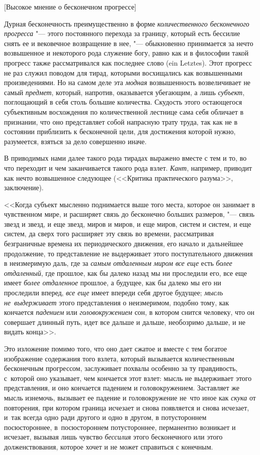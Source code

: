 %
{[Высокое мнение о бесконечном прогрессе]}

Дурная бесконечность преимущественно в форме
{\em количественного бесконечного прогресса} "--- этого постоянного перехода за
границу, который есть бессилие снять ее и вековечное возвращение в нее,
"--- обыкновенно принимается за нечто возвышенное и некоторого рода служение
богу, равно как и в философии такой прогресс также рассматривался как последнее
слово (ein Letztes). Этот прогресс не раз служил поводом для тирад, которыми
восхищались как возвышенными произведениями. Но на самом деле эта {\em модная}
возвышенность возвеличивает не самый {\em предмет}, который, напротив,
оказывается убегающим, а лишь {\em субъект}, поглощающий в себя столь большие
количества. Скудость этого остающегося субъективным восхождения по
количественной лестнице сама себя обличает в признании, что оно представляет
собой напрасную трату труда, так как не в состоянии приблизить к бесконечной
цели, для достижения которой нужно, разумеется, взяться за дело совершенно
иначе.

В приводимых нами далее такого рода тирадах выражено вместе с тем и то, во что
переходит и чем заканчивается такого рода взлет. {\em Кант}, например, приводит
как нечто возвышенное следующее (<<Критика практического разума>>, заключение).

<<Когда субъект мысленно поднимается выше того места, которое он занимает в
чувственном мире, и расширяет связь до бесконечно больших размеров, "--- связь
звезд и звезд, и еще звезд, миров и миров, и еще миров, систем и систем, и еще
систем, да сверх того расширяет эту связь во времени, рассматривая безграничные
времена их периодического движения, его начало и дальнейшее продолжение, то
представление не выдерживает этого поступательного движения в неизмеримую даль,
где за {\em самым отдаленным миром все еще} есть {\em более отдаленный}, где
прошлое, как бы далеко назад мы ни проследили его, все еще имеет
{\em более отдаленное} прошлое, а будущее, как бы далеко мы его ни проследили
вперед, {\em все еще} имеет впереди себя другое будущее;
{\em мысль не~выдерживает} этого представления о неизмеримом, подобно тому, как
кончается {\em падением} или {\em головокружением} сон, в котором снится
человеку, что он совершает длинный путь, идет все дальше и дальше, необозримо
дальше, и не видать конца>>.

Это изложение помимо того, что оно дает сжатое и вместе с тем богатое
изображение содержания того взлета, который вызывается количественным
бесконечным прогрессом, заслуживает похвалы особенно за ту правдивость,
с~которой оно указывает, чем кончается этот взлет: мысль не выдерживает этого
представления, и оно кончается падением и головокружением. Заставляет же мысль
изнемочь, вызывает ее падение и головокружение не~что иное как {\em скука} от
повторения, при котором граница исчезает и снова появляется и снова исчезает,
и~так всегда одно ради другого и одно в другом, в потустороннем посюстороннее,
в~посюстороннем потустороннее, перманентно возникает и исчезает, вызывая лишь
чувство {\em бессилия} этого бесконечного или этого долженствования, которое
хочет и не может справиться с конечным.


